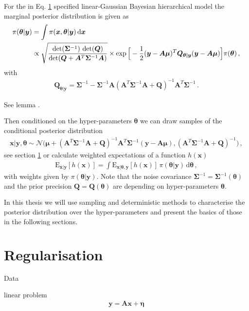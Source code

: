 For the in Eq. \ref{} specified linear-Gaussian Bayesian hierarchical model the marginal posterior distribution is given as
\begin{align}
	\pi(\bm{\theta} | \bm{y}) &= \int \pi(\bm{x}, \bm{\theta} | \bm{y}) \mathop{}\!\mathrm{d} \bm{x} \\ 
	\label{eq:condHyper}
	&\propto \sqrt{ \frac{ \det( \bm{\Sigma}^{-1} ) \,  \det( \bm{Q}) }{\det( \bm{Q} + \bm{A}^T \bm{\Sigma}^{-1} \bm{A} ) } } \times \exp \Big[ - \frac{1}{2}(\bm{y} -\bm{A \mu})^T \bm{Q}_{\bm{\theta|y}} (\bm{y} -\bm{A \mu}) \Big] \pi(\bm{\theta}) \, ,
\end{align}
with
\begin{align}
	\bm{Q}_{\bm{\theta|y}} = \bm{\Sigma}^{-1} - \bm{\Sigma}^{-1} \bm{A} (\bm{A}^T \bm{\Sigma}^{-1} \bm{A} + \bm{Q} )^{-1} \bm{A}^T \bm{\Sigma}^{-1} \,  .
\end{align}

See lemma \cite{}.

Then conditioned on the hyper-parameters $\bm{\theta}$ we can draw samples of the conditional posterior distribution
\begin{align}
	\bm{x}| \bm{y} , \bm{\theta} \sim \mathcal{N}\big( \bm{\mu} + (\bm{A}^T \bm{\Sigma}^{-1} \bm{A} + \bm{Q} )^{-1} \bm{A}^T \bm{\Sigma}^{-1} (\bm{y} - \bm{A} \bm{\mu}), (\bm{A}^T \bm{\Sigma}^{-1} \bm{A} + \bm{Q} )^{-1} \big) \, ,
\end{align}
see section \ref{} or calculate weighted expectations of a function $h(\bm{x})$
\begin{align}
	\label{eq:lte}
	\text{E}_{\bm{x}|\bm{y}} [h(\bm{x})] = \int   \text{E}_{\bm{x}|\bm{\theta},\bm{y}} [h(\bm{x})] \, \pi(\bm{\theta} | \bm{y} )  \, \text{d} \bm{\theta} \,  ,
\end{align}
with weights given by $\pi(\bm{\theta} | \bm{y} )$.
\cite{}
Note that the noise covariance $\bm{\Sigma}^{-1} = \bm{\Sigma}^{-1}( \bm{\theta}) $ and the prior precision $\bm{Q} = \bm{Q}( \bm{\theta})$ are depending on hyper-parameters $\bm{\theta}$.

In this thesis we will use sampling and deterministic methods to characterise the posterior distribution over the hyper-parameters and present the basics of those in the following sections.

\section{Regularisation}

Data

linear problem
\begin{align}
	\bm{y} = \bm{A}\bm{x} + \bm{\eta}
\end{align}

